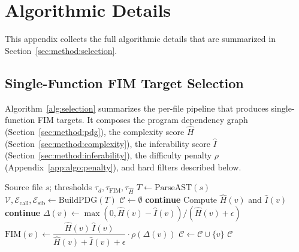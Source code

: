 \section{Algorithmic Details}
\label{app:algo}

This appendix collects the full algorithmic details that are summarized
in Section~\ref{sec:method:selection}.

\subsection{Single-Function FIM Target Selection}
\label{app:algo:single}

Algorithm~\ref{alg:selection} summarizes the per-file pipeline that
produces single-function FIM targets. It composes the program dependency
graph (Section~\ref{sec:method:pdg}), the complexity score $\hat{H}$
(Section~\ref{sec:method:complexity}), the inferability score $\hat{I}$
(Section~\ref{sec:method:inferability}), the difficulty penalty $\rho$
(Appendix~\ref{app:algo:penalty}), and hard filters described below.

\begin{algorithm}[h]
\caption{Single-function FIM target selection for one file.}
\label{alg:selection}
\begin{algorithmic}[1]
  \Require Source file $s$; thresholds $\tau_d, \tau_{\mathrm{FIM}}, \tau_{\hat H}$
  \State $T \gets \mathrm{ParseAST}(s)$
  \State $\mathcal{V}, \mathcal{E}_{\mathrm{call}}, \mathcal{E}_{\mathrm{sib}} \gets \mathrm{BuildPDG}(T)$
  \State $\mathcal{C} \gets \emptyset$
      \State \textbf{continue}
    \EndIf
    \State Compute $\hat{H}(v)$ and $\hat{I}(v)$
     \textbf{continue} \EndIf
    \State $\Delta(v) \gets \max(0, \hat{H}(v)-\hat{I}(v)) / (\hat{H}(v)+\epsilon)$
    \State $\mathrm{FIM}(v) \gets \dfrac{\hat{H}(v)\,\hat{I}(v)}{\hat{H}(v)+\hat{I}(v)+\epsilon}\cdot \rho(\Delta(v))$
      \State $\mathcal{C} \gets \mathcal{C} \cup \{v\}$
    \EndIf
  \EndFor
  \State \Return $\mathcal{C}$ 
\end{algorithmic}
\end{algorithm}

